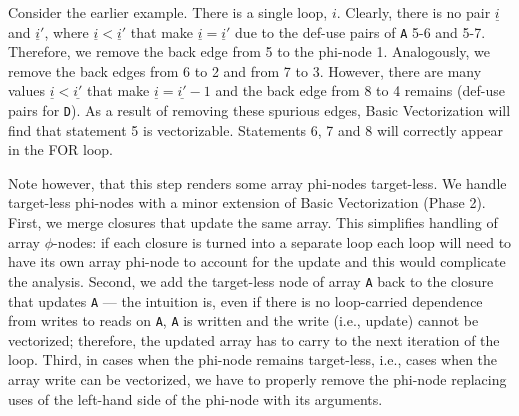 Consider the earlier example. There is a single loop, $i$. Clearly, there is no pair $\underline{i}$ and $\underline{i}'$, where $\underline{i} < \underline{i}'$ that make $\underline{i} = \underline{i}'$
due to the def-use pairs of \texttt{A} 5-6 and 5-7.
Therefore, we remove the back edge from 5 to the phi-node 1. Analogously, we remove the back edges from 6 to 2 and from 7 to 3. However, there are many values $\underline{i} < \underline{i'}$ that make $\underline{i} = \underline{i'}-1$ and the back edge from 8 to 4 remains (def-use pairs for \texttt{D}). As a result of removing these spurious edges, Basic Vectorization will find that statement 5 is vectorizable. Statements 6, 7 and 8 will correctly appear in the FOR loop.

Note however, that this step renders some array phi-nodes target-less. We handle target-less phi-nodes with a minor extension of Basic Vectorization (Phase 2).
First, we merge closures that update the same array. This simplifies handling of array $\phi$-nodes: if each closure is turned into a separate loop
each loop will need to have its own array phi-node to account for the update and this would complicate the analysis.
Second, we add the target-less node of array \texttt{A} back to the closure that updates \texttt{A} ---
the intuition is, even if there is no loop-carried dependence from writes to reads on \texttt{A}, \texttt{A} is written and the write (i.e., update) cannot be vectorized;
therefore, the updated array has to carry to the next iteration of the loop. Third, in cases when the phi-node remains target-less, i.e., cases when the
array write can be vectorized, we have to properly remove the phi-node replacing uses of the left-hand side of the phi-node with its arguments.



